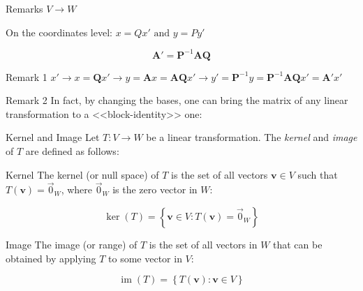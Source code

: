 \documentclass[fullscreen=true, bookmarks=true, hyperref={pdfencoding=unicode}]{beamer}
\begin{document}
\begin{frame}{Remarks}
  $V \rightarrow W$

  On the coordinates level: 
  $x=Qx' \text{ and } y=Py'$

  \[
  \mathbf{A}' = \mathbf{P}^{-1} \mathbf{A} \mathbf{Q}
  \]
  
  \pause
  \begin{block}{Remark 1}
    $x' \rightarrow x=\mathbf{Q}x' \rightarrow y = \mathbf{A}x = 
    \mathbf{A}\mathbf{Q}x' \rightarrow y' = \mathbf{P}^{-1}y=
    \mathbf{P}^{-1} \mathbf{A} \mathbf{Q}x' = \mathbf{A}'x'$
  \end{block}

  \pause
  \newcommand{\sidelen}{2.5cm}
  \newcommand{\shift}{0.25cm}
  \begin{block}{Remark 2}
    In fact, by changing the bases, one can bring the matrix of any 
    linear transformation to a <<block-identity>> one:

    \centering
  \end{block}
\end{frame}


\begin{frame}{Kernel and Image}
  Let $T: V \rightarrow W$ be a linear transformation. The \emph{kernel} and \emph{image} of $T$ are defined as follows:
  
  \begin{block}{Kernel}
  The \alert{kernel} (or null space) of $T$ is the set of all 
  vectors $\mathbf{v} \in V$ such that $T(\mathbf{v}) = \vec{0}_W$, 
  where $\vec{0}_W$ is the zero vector in $W$:
  
  \[
  \operatorname{ker}(T) = \left\{ \mathbf{v} \in V : T(\mathbf{v}) = 
  \vec{0}_W \right\}
  \]
  \end{block}
  
  \begin{block}{Image}
  The \alert{image} (or range) of $T$ is the set of all vectors in $W$ 
  that can be obtained by applying $T$ to some vector in $V$:
  
  \[
  \operatorname{im}(T) = \left\{ T(\mathbf{v}) : \mathbf{v} \in V \right\}
  \]
  \end{block}  
\end{frame}
  
\end{document}
